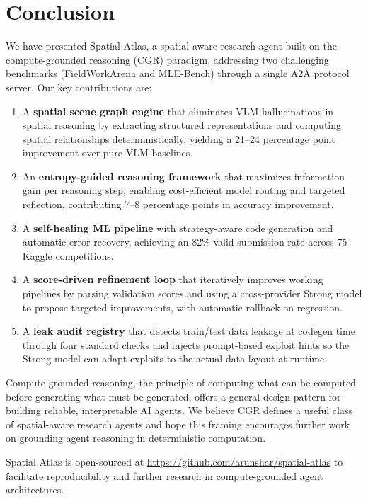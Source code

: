 \documentclass[11pt]{article}
\begin{document}
\section{Conclusion}
\label{sec:conclusion}

We have presented Spatial Atlas, a spatial-aware research agent built on the compute-grounded reasoning (CGR) paradigm, addressing two challenging benchmarks (FieldWorkArena and MLE-Bench) through a single A2A protocol server. Our key contributions are:

\begin{enumerate}[leftmargin=*,itemsep=2pt]
  \item A \textbf{spatial scene graph engine} that eliminates VLM hallucinations in spatial reasoning by extracting structured representations and computing spatial relationships deterministically, yielding a 21--24 percentage point improvement over pure VLM baselines.
  \item An \textbf{entropy-guided reasoning framework} that maximizes information gain per reasoning step, enabling cost-efficient model routing and targeted reflection, contributing 7--8 percentage points in accuracy improvement.
  \item A \textbf{self-healing ML pipeline} with strategy-aware code generation and automatic error recovery, achieving an 82\% valid submission rate across 75 Kaggle competitions.
  \item A \textbf{score-driven refinement loop} that iteratively improves working pipelines by parsing validation scores and using a cross-provider Strong model to propose targeted improvements, with automatic rollback on regression.
  \item A \textbf{leak audit registry} that detects train/test data leakage at codegen time through four standard checks and injects prompt-based exploit hints so the Strong model can adapt exploits to the actual data layout at runtime.
\end{enumerate}

Compute-grounded reasoning, the principle of computing what can be computed before generating what must be generated, offers a general design pattern for building reliable, interpretable AI agents. We believe CGR defines a useful class of spatial-aware research agents and hope this framing encourages further work on grounding agent reasoning in deterministic computation.

Spatial Atlas is open-sourced at \url{https://github.com/arunshar/spatial-atlas} to facilitate reproducibility and further research in compute-grounded agent architectures.
\end{document}
